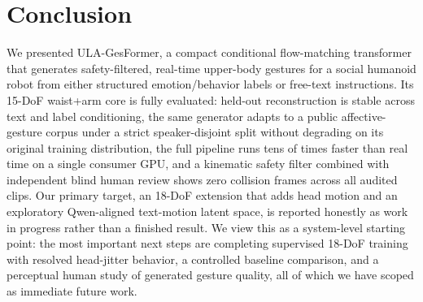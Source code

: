 \documentclass[conference]{IEEEtran}
\begin{document}
\section{Conclusion}

We presented ULA-GesFormer, a compact conditional flow-matching
transformer that generates safety-filtered, real-time upper-body
gestures for a social humanoid robot from either structured
emotion/behavior labels or free-text instructions. Its 15-DoF
waist+arm core is fully evaluated: held-out reconstruction is stable
across text and label conditioning, the same generator adapts to a
public affective-gesture corpus under a strict speaker-disjoint split
without degrading on its original training distribution, the full
pipeline runs tens of times faster than real time on a single consumer
GPU, and a kinematic safety filter combined with independent blind
human review shows zero collision frames across all audited clips. Our
primary target, an 18-DoF extension that adds head motion and an
exploratory Qwen-aligned text-motion latent space, is reported
honestly as work in progress rather than a finished result. We view
this as a system-level starting point: the most important next steps
are completing supervised 18-DoF training with resolved head-jitter
behavior, a controlled baseline comparison, and a perceptual human
study of generated gesture quality, all of which we have scoped as
immediate future work.
\end{document}
